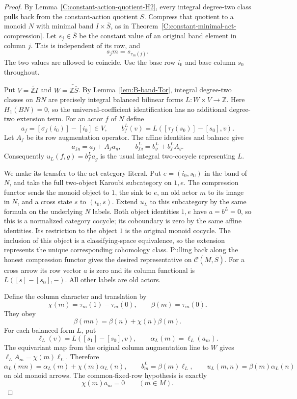 \begin{proof}
By Lemma~\ref{C:constant-action-quotient-H2}, every integral
degree-two class pulls back from the constant-action quotient
$\bar S$.  Compress that quotient to a monoid $N$ with minimal
band $I\times\bar S$, as in
Theorem~\ref{C:constant-minimal-act-compression}.
Let $s_j\in\bar S$ be the constant value of an original band
element in column $j$.  This is independent of its row, and
\[
 s_jm=s_{\tau_m(j)}.
\]
The two values are allowed to coincide.  Use the base row $i_0$
and base column $s_0$ throughout.

Put $V=\widetilde{\mathbb ZI}$ and
$W=\widetilde{\mathbb Z\bar S}$.
By Lemma~\ref{lem:B-band-Tor}, integral degree-two classes on
$BN$ are precisely integral balanced bilinear forms
$L:W\times V\to\mathbb Z$.
Here $H_1(BN)=0$, so the universal-coefficient identification
has no additional degree-two extension term.
For an actor $f$ of $N$ define
\[
 a_f=[\sigma_f(i_0)]-[i_0]\in V,\qquad
 b^L_f(v)=L([\tau_f(s_0)]-[s_0],v).
\]
Let $A_f$ be its row augmentation operator.  The affine identities
and balance give
\[
 a_{fg}=a_f+A_fa_g,\qquad
 b^L_{fg}=b^L_g+b^L_fA_g.
\]
Consequently $u_L(f,g)=b^L_fa_g$ is the usual integral
two-cocycle representing $L$.

We make its transfer to the act category literal.
Put $e=(i_0,s_0)$ in the band of $N$, and take the full
two-object Karoubi subcategory on $1,e$.
The compression functor sends the monoid object to $1$, the
sink to $e$, an old actor $m$ to its image in $N$, and a cross
state $s$ to $(i_0,s)$.  Extend $u_L$ to this subcategory by the
same formula on the underlying $N$ labels.
Both object identities $1,e$ have $a=b^L=0$, so this is a
normalized category cocycle; its coboundary is zero by the
same affine identities.  Its restriction to the object $1$
is the original monoid cocycle.  The inclusion of this object
is a classifying-space equivalence, so the extension represents
the unique corresponding cohomology class.  Pulling back along
the honest compression functor gives the desired representative
on $\mathcal C(M,\bar S)$.
For a cross arrow its row vector $a$ is zero and its column
functional is $L([s]-[s_0],-)$.  All other labels are old actors.

Define the column character and translation by
\[
 \chi(m)=\tau_m(1)-\tau_m(0),\qquad
 \beta(m)=\tau_m(0).
\]
They obey
\[
 \beta(mn)=\beta(n)+\chi(n)\beta(m).
\]
For each balanced form $L$, put
\[
 \ell_L(v)=L([s_1]-[s_0],v),\qquad
 \alpha_L(m)=\ell_L(a_m).
\]
The equivariant map from the original column augmentation line
to $W$ gives $\ell_LA_m=\chi(m)\ell_L$.  Therefore
\[
 \alpha_L(mn)=\alpha_L(m)+\chi(m)\alpha_L(n),
 \qquad
 b^L_m=\beta(m)\ell_L,
 \qquad
 u_L(m,n)=\beta(m)\alpha_L(n)
\]
on old monoid arrows.
The common-fixed-row hypothesis is exactly
\[
 \chi(m)a_m=0\qquad(m\in M).
\]


\end{proof}
